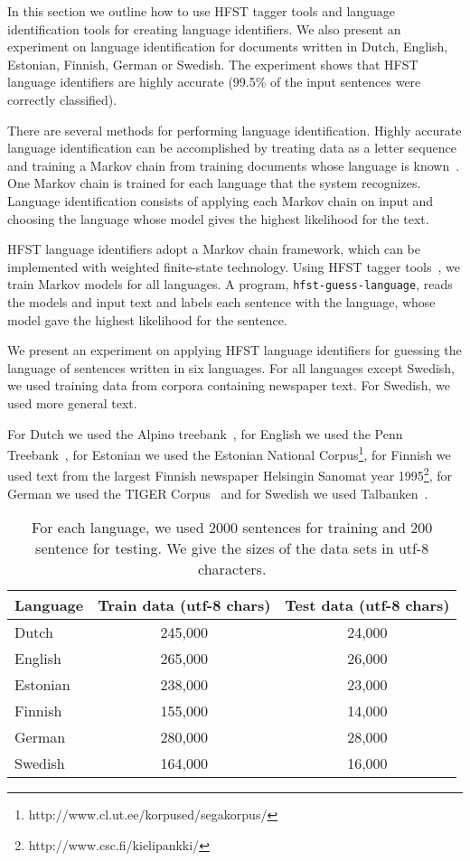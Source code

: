 \documentclass{llncs}
\begin{document}
In this section we outline how to use HFST tagger tools and language
identification tools for creating language identifiers. We also
present an experiment on language identification for documents written
in Dutch, English, Estonian, Finnish, German or Swedish. The
experiment shows that HFST language identifiers are highly accurate
(99.5\% of the input sentences were correctly classified).

There are several methods for performing language
identification. Highly accurate language identification can be
accomplished by treating data as a letter sequence and training
a Markov chain from training documents whose language is
known~\cite{cavnar/1994}. One Markov chain is trained for each
language that the system recognizes. Language identification consists
of applying each Markov chain on input and choosing the language whose
model gives the highest likelihood for the text. 

HFST language identifiers adopt a Markov chain framework, which can be
implemented with weighted finite-state technology. Using HFST tagger
tools~\cite{silfverberg/2011}, we train Markov models for all
languages. A program, {\tt hfst-guess-language}, reads the
models and input text and labels each sentence with the language,
whose model gave the highest likelihood for the sentence.

We present an experiment on applying HFST language identifiers for
guessing the language of sentences written in six languages. For all
languages except Swedish, we used training data from corpora
containing newspaper text. For Swedish, we used more general text.

For Dutch we used the Alpino treebank~\cite{bouma/2000}, for English
we used the Penn Treebank~\cite{marcus/1993}, for Estonian we used the
Estonian National
Corpus\footnote{http://www.cl.ut.ee/korpused/segakorpus/}, for
Finnish we used text from the largest Finnish newspaper Helsingin
Sanomat year 1995\footnote{http://www.csc.fi/kielipankki/}, for
German we used the TIGER Corpus~\cite{brants/2002} and for Swedish we
used Talbanken~\cite{einarsson/1976}.

\begin{table}
\small
\begin{center}
\caption{For each language, we used 2000 sentences for training and
  200 sentence for testing. We give the sizes of the data sets in
  utf-8 characters.}\label{tab:lang-id-data}
\begin{tabular}{l|cc}
Language & Train data (utf-8 chars) & Test data (utf-8 chars)\\
\hline
Dutch    & 245,000  & 24,000\\
English  & 265,000  & 26,000\\
Estonian & 238,000  & 23,000\\
Finnish  & 155,000  & 14,000\\
German   & 280,000  & 28,000\\
Swedish  & 164,000  & 16,000\\
\end{tabular}
\end{center}
\end{table}
\end{document}
